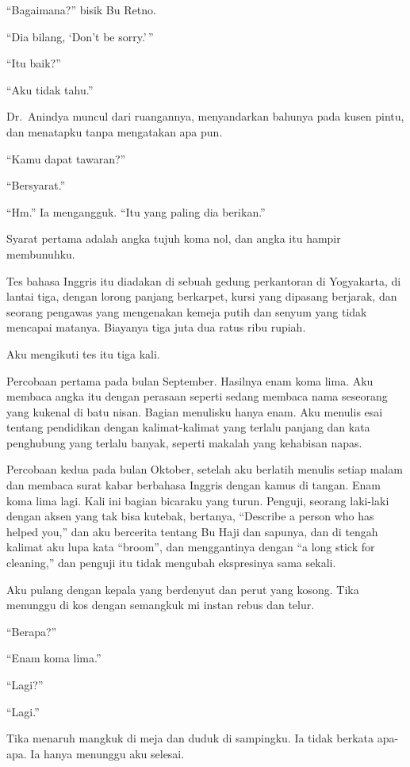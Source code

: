\documentclass[11pt,twoside,openany]{book}
\makeatletter
\newcommand{\scenebreak}{\par\vspace{0.9em}{\centering\textsc{*\hspace{0.7em}*\hspace{0.7em}*}\par}\vspace{0.9em}\@afterindentfalse\@afterheading}
\makeatother
\begin{document}
``Bagaimana?'' bisik Bu Retno.

``Dia bilang, `Don't be sorry.'\,''

``Itu baik?''

``Aku tidak tahu.''

Dr.~Anindya muncul dari ruangannya, menyandarkan bahunya pada kusen pintu, dan menatapku tanpa mengatakan apa pun.

``Kamu dapat tawaran?''

``Bersyarat.''

``Hm.'' Ia mengangguk. ``Itu yang paling dia berikan.''

\scenebreak
Syarat pertama adalah angka tujuh koma nol, dan angka itu hampir membunuhku.

Tes bahasa Inggris itu diadakan di sebuah gedung perkantoran di Yogyakarta, di lantai tiga, dengan lorong panjang berkarpet, kursi yang dipasang berjarak, dan seorang pengawas yang mengenakan kemeja putih dan senyum yang tidak mencapai matanya. Biayanya tiga juta dua ratus ribu rupiah.

Aku mengikuti tes itu tiga kali.

Percobaan pertama pada bulan September. Hasilnya enam koma lima. Aku membaca angka itu dengan perasaan seperti sedang membaca nama seseorang yang kukenal di batu nisan. Bagian menulisku hanya enam. Aku menulis esai tentang pendidikan dengan kalimat-kalimat yang terlalu panjang dan kata penghubung yang terlalu banyak, seperti makalah yang kehabisan napas.

Percobaan kedua pada bulan Oktober, setelah aku berlatih menulis setiap malam dan membaca surat kabar berbahasa Inggris dengan kamus di tangan. Enam koma lima lagi. Kali ini bagian bicaraku yang turun. Penguji, seorang laki-laki dengan aksen yang tak bisa kutebak, bertanya, ``Describe a person who has helped you,'' dan aku bercerita tentang Bu Haji dan sapunya, dan di tengah kalimat aku lupa kata ``broom'', dan menggantinya dengan ``a long stick for cleaning,'' dan penguji itu tidak mengubah ekspresinya sama sekali.

Aku pulang dengan kepala yang berdenyut dan perut yang kosong. Tika menunggu di kos dengan semangkuk mi instan rebus dan telur.

``Berapa?''

``Enam koma lima.''

``Lagi?''

``Lagi.''

Tika menaruh mangkuk di meja dan duduk di sampingku. Ia tidak berkata apa-apa. Ia hanya menunggu aku selesai.
\end{document}
